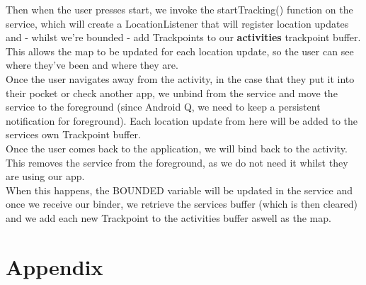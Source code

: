 \documentclass[11pt]{article}
\begin{document}
Then when the user presses start, we invoke the startTracking() function on the service, which will create a LocationListener that will register location updates and - whilst we're bounded - add Trackpoints to our \textbf{activities} trackpoint buffer. This allows the map to be updated for each location update, so the user can see where they've been and where they are. \\

Once the user navigates away from the activity, in the case that they put it into their pocket or check another app, we unbind from the service and move the service to the foreground (since Android Q, we need to keep a persistent notification for foreground). Each location update from here will be added to the services own Trackpoint buffer. \\ 

Once the user comes back to the application, we will bind back to the activity. This removes the service from the foreground, as we do not need it whilst they are using our app. \\
When this happens, the BOUNDED variable will be updated in the service and once we receive our binder, we retrieve the services buffer (which is then cleared) and we add each new Trackpoint to the activities buffer aswell as the map. \\

















\newpage
\section{Appendix}
\end{document}
